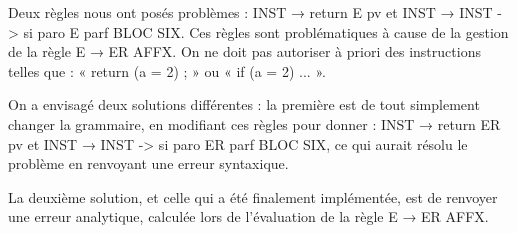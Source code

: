 Deux règles nous ont posés problèmes : INST → return E pv et INST → INST -> si
paro  E  parf BLOC SIX. Ces règles sont problématiques à cause de la gestion de
la règle E → ER AFFX. On ne doit pas autoriser à priori des instructions telles
que : « return (a = 2) ; » ou « if (a = 2) {...} ».

On a envisagé deux solutions différentes : la première est de tout simplement
changer la grammaire, en modifiant ces règles pour donner : INST → return ER pv
et  INST → INST -> si paro  ER  parf BLOC SIX, ce qui aurait résolu le problème
en renvoyant une erreur syntaxique.

La deuxième solution, et celle qui a été finalement implémentée, est de renvoyer
une erreur analytique, calculée lors de l'évaluation de la règle E → ER AFFX.


